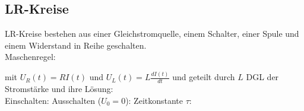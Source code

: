 \subsection{LR-Kreise}
    LR-Kreise bestehen aus einer Gleichstromquelle, einem Schalter, einer Spule und einem Widerstand in Reihe geschalten.\\
    Maschenregel:

    mit $U_R(t) = R I(t)$ und $U_L(t) = L \frac{dI(t)}{dt}$ und geteilt durch $L$
    DGL der Stromstärke und ihre Lösung:\\
    Einschalten:
    Ausschalten ($U_0 = 0$):
    Zeitkonstante $\tau$:
